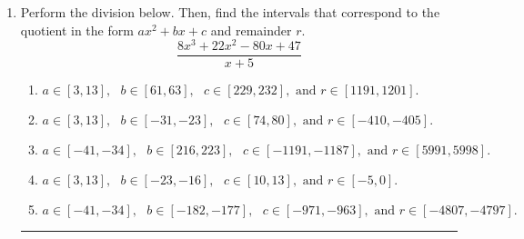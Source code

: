 \documentclass[14pt]{extbook}
\newcommand{\litem}[1]{\item#1\hspace*{-1cm}\rule{\textwidth}{0.4pt}}
\begin{document}
\begin{enumerate}
{\begin{enumerate}[label=\Alph*.]
\end{enumerate} }
\litem{
Perform the division below. Then, find the intervals that correspond to the quotient in the form $ax^2+bx+c$ and remainder $r$.\[ \frac{8x^{3} +22 x^{2} -80 x + 47}{x + 5} \]\begin{enumerate}[label=\Alph*.]
\item \( a \in [3, 13], \text{   } b \in [61, 63], \text{   } c \in [229, 232], \text{   and   } r \in [1191, 1201]. \)
\item \( a \in [3, 13], \text{   } b \in [-31, -23], \text{   } c \in [74, 80], \text{   and   } r \in [-410, -405]. \)
\item \( a \in [-41, -34], \text{   } b \in [216, 223], \text{   } c \in [-1191, -1187], \text{   and   } r \in [5991, 5998]. \)
\item \( a \in [3, 13], \text{   } b \in [-23, -16], \text{   } c \in [10, 13], \text{   and   } r \in [-5, 0]. \)
\item \( a \in [-41, -34], \text{   } b \in [-182, -177], \text{   } c \in [-971, -963], \text{   and   } r \in [-4807, -4797]. \)

\end{enumerate} }
\end{enumerate}
\end{document}
